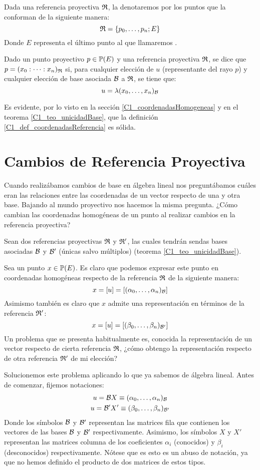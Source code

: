 Dada una referencia proyectiva $\mathfrak{R}$, la denotaremos por los puntos que la conforman de la siguiente manera:
\begin{equation}
\label{C1_eq_notacionReferencias}
\mathfrak{R}=\{p_0,\dots,p_n;E\}
\end{equation}
Donde $E$ representa el último punto al que llamaremos .
\begin{defi}
	\label{C1_def_coordenadasReferencia}
	Dado un punto proyectivo $p\in\mathbb{P}(E)$ y una referencia proyectiva $\mathfrak{R}$, se dice que $p=(x_0:\dots :x_n)_{\mathfrak{R}}$ si, para cualquier elección de $u$ (representante del rayo $p$) y cualquier elección de base asociada $\mathcal{B}$ a $\mathfrak{R}$, se tiene que:
	\[u=\lambda(x_0,\dots,x_n)_{\mathcal{B}}\]
\end{defi}
Es evidente, por lo visto en la sección \ref{C1_coordenadasHomogeneas} y en el teorema \ref{C1_teo_unicidadBase}, que la definición \ref{C1_def_coordenadasReferencia} es sólida.
\section{Cambios de Referencia Proyectiva}
Cuando realizábamos cambios de base en álgebra lineal nos preguntábamos cuáles eran las relaciones entre las coordenadas de un vector respecto de una y otra base. Bajando al mundo proyectivo nos hacemos la misma pregunta. ¿Cómo cambian las coordenadas homogéneas de un punto al realizar cambios en la referencia proyectiva?

Sean dos referencias proyectivas $\mathfrak{R}$ y $\mathfrak{R}'$, las cuales tendrán sendas bases asociadas $\mathcal{B}$ y $\mathcal{B}'$ (únicas salvo múltiplos) (teorema \ref{C1_teo_unicidadBase}).

Sea un punto $x\in\mathbb{P}(E)$. Es claro que podemos expresar este punto en coordenadas homogéneas respecto de la referencia $\mathfrak{R}$ de la siguiente manera:
\[x=\left [ u \right ]=\left [ (\alpha_0,\dots,\alpha_n)_{\mathcal{B}} \right ]\]
Asimismo también es claro que $x$ admite una representación en términos de la referencia $\mathfrak{R}'$:
\[x=\left [ u \right ]=\left [ (\beta_0,\dots,\beta_n)_{\mathcal{B}'} \right ]\]
Un problema que se presenta habitualmente es, conocida la representación de un vector respecto de cierta referencia $\mathfrak{R}$, ¿cómo obtengo la representación respecto de otra referencia $\mathfrak{R}'$ de mi elección?

Solucionemos este problema aplicando lo que ya sabemos de álgebra lineal. Antes de comenzar, fijemos notaciones:
\begin{gather*}
	u=\mathcal{B}X\equiv(\alpha_0,\dots,\alpha_n)_{\mathcal{B}}\\
	u=\mathcal{B}'X'\equiv(\beta_0,\dots,\beta_n)_{\mathcal{B}'}
\end{gather*}
Donde los símbolos $\mathcal{B}$ y $\mathcal{B}'$ representan las matrices fila que contienen los vectores de las bases $\mathcal{B}$ y $\mathcal{B}'$ respectivamente. Asimismo, los símbolos $X$ y $X'$ representan las matrices columna de los coeficientes $\alpha_i$ (conocidos) y $\beta_i$ (desconocidos) respectivamente. Nótese que es esto es un abuso de notación, ya que no hemos definido el producto de dos matrices de estos tipos.

